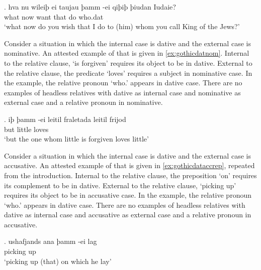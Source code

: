 \exg. hva nu wileiþ ei taujau þamm -ei qiþiþ þiudan Iudaie?\\
 what now want that do\scsub{[dat]} who.\ac{dat}    \\
 `what now do you wish that I do to (him) whom you call King of the Jews?' \label{ex:gothicdataccrep}

Consider a situation in which the internal case is dative and the external case is nominative. An attested example of that is given in  \ref{ex:gothicdatnom}. Internal to the relative clause,  `is forgiven' requires its object to be in dative. External to the relative clause, the predicate  `loves' requires a subject in nominative case. In the example, the relative pronoun  `who.' appears in dative case. There are no examples of headless relatives with dative as internal case and nominative as external case and a relative pronoun in nominative.

\exg. iþ þamm -ei leitil fraletada leitil frijod\\
 but     little loves\scsub{[nom]}\\
 `but the one whom little is forgiven loves little' \label{ex:gothicdatnom}

Consider a situation in which the internal case is dative and the external case is accusative. An attested example of that is given in  \ref{ex:gothicdataccrep}, repeated from the introduction. Internal to the relative clause, the preposition  `on' requires its complement to be in dative. External to the relative clause,  `picking up' requires its object to be in accusative case. In the example, the relative pronoun  `who.' appears in dative case. There are no examples of headless relatives with dative as internal case and accusative as external case and a relative pronoun in accusative.

\exg. ushafjands ana þamm -ei lag\\
 {picking up}\scsub{[acc]}    \\
 `picking up (that) on which he lay' \label{ex:gothicaccdatrep}

